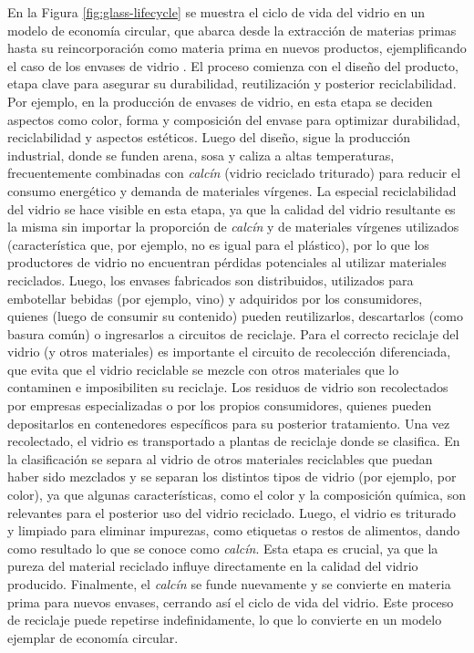 En la Figura \ref{fig:glass-lifecycle} se muestra el ciclo de vida del vidrio en un modelo de economía circular, que abarca desde la extracción de materias primas hasta su reincorporación como materia prima en nuevos productos, ejemplificando el caso de los envases de vidrio \cite{prodvidrio2024verallia}. El proceso comienza con el diseño del producto, etapa clave para asegurar su durabilidad, reutilización y posterior reciclabilidad. Por ejemplo, en la producción de envases de vidrio, en esta etapa se deciden aspectos como color, forma y composición del envase para optimizar durabilidad, reciclabilidad y aspectos estéticos. Luego del diseño, sigue la producción industrial, donde se funden arena, sosa y caliza a altas temperaturas, frecuentemente combinadas con \textit{calcín} (vidrio reciclado triturado) para reducir el consumo energético y demanda de materiales vírgenes. La especial reciclabilidad del vidrio se hace visible en esta etapa, ya que la calidad del vidrio resultante es la misma sin importar la proporción de \textit{calcín} y de materiales vírgenes utilizados (característica que, por ejemplo, no es igual para el plástico), por lo que los productores de vidrio no encuentran pérdidas potenciales al utilizar materiales reciclados. Luego, los envases fabricados son distribuidos, utilizados para embotellar bebidas (por ejemplo, vino) y adquiridos por los consumidores, quienes (luego de consumir su contenido) pueden reutilizarlos, descartarlos (como basura común) o ingresarlos a circuitos de reciclaje. Para el correcto reciclaje del vidrio (y otros materiales) es importante el circuito de recolección diferenciada, que evita que el vidrio reciclable se mezcle con otros materiales que lo contaminen e imposibiliten su reciclaje. Los residuos de vidrio son recolectados por empresas especializadas o por los propios consumidores, quienes pueden depositarlos en contenedores específicos para su posterior tratamiento.
Una vez recolectado, el vidrio es transportado a plantas de reciclaje donde se clasifica. En la clasificación se separa al vidrio de otros materiales reciclables que puedan haber sido mezclados y se separan los distintos tipos de vidrio (por ejemplo, por color), ya que algunas características, como el color y la composición química, son relevantes para el posterior uso del vidrio reciclado. Luego, el vidrio es triturado y limpiado para eliminar impurezas, como etiquetas o restos de alimentos, dando como resultado lo que se conoce como \textit{calcín}. Esta etapa es crucial, ya que la pureza del material reciclado influye directamente en la calidad del vidrio producido. Finalmente, el \textit{calcín} se funde nuevamente y se convierte en materia prima para nuevos envases, cerrando así el ciclo de vida del vidrio. Este proceso de reciclaje puede repetirse indefinidamente, lo que lo convierte en un modelo ejemplar de economía circular.

